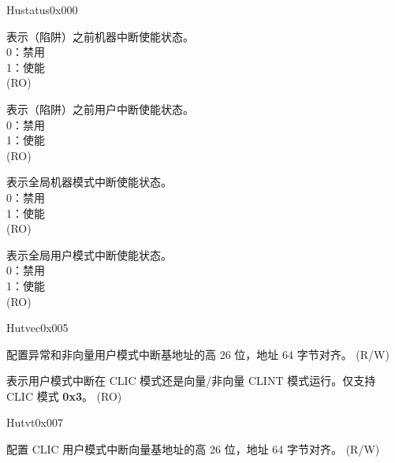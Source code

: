 \begin{register}{H}{ustatus}{0x000}
\begin{regdesc}\begin{reglist}
\item [接上页……]
\label{fielddesc:USTATUSMPIE}\item [MPIE] 表示（陷阱）之前机器中断使能状态。\\
0：禁用\\
1：使能\\
(RO)
\label{fielddesc:USTATUSUPIE}\item [UPIE] 表示（陷阱）之前用户中断使能状态。\\
0：禁用\\
1：使能\\
(RO)
\label{fielddesc:USTATUSMIE}\item [MIE] 表示全局机器模式中断使能状态。\\
0：禁用\\
1：使能\\
(RO)
\label{fielddesc:USTATUSUIE}\item [UIE] 表示全局用户模式中断使能状态。\\
0：禁用\\
1：使能\\
(RO)
\end{reglist}\end{regdesc}
\end{register}

\begin{register}{H}{utvec}{0x005}\label{regdesc:UTVEC}
%
%
%
\regnewline%
\begin{regdesc}\begin{reglist}
\label{fielddesc:UTVECBASE}\item [BASE] 配置异常和非向量用户模式中断基地址的高 26 位，地址 64 字节对齐。 (R/W)
\label{fielddesc:UTVECMODE}\item [MODE] 表示用户模式中断在 CLIC 模式还是向量/非向量 CLINT 模式运行。仅支持 CLIC 模式 \textbf{0x3}。 (RO)
\end{reglist}\end{regdesc}
\end{register}

\begin{register}{H}{utvt}{0x007}\label{regdesc:UTVT}
%
%
\regnewline%
\begin{regdesc}\begin{reglist}
\label{fielddesc:UTVTBASE}\item [BASE] 配置 CLIC 用户模式中断向量基地址的高 26 位，地址 64 字节对齐。 (R/W)
\end{reglist}\end{regdesc}
\end{register}

